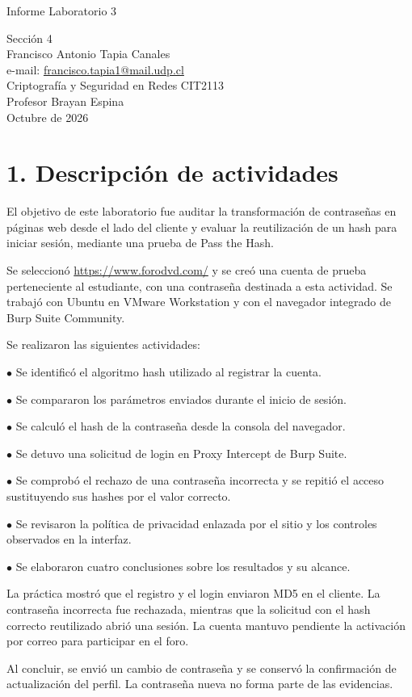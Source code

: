 \documentclass[11pt,letterpaper]{article}
\begin{document}
\raggedright
\begin{center}{\LARGE Informe Laboratorio 3}\end{center}
\begin{center}Sección 4\\[9pt]
Francisco Antonio Tapia Canales\\
e-mail: \href{mailto:francisco.tapia1@mail.udp.cl}{francisco.tapia1@mail.udp.cl}\\[9pt]
Criptografía y Seguridad en Redes CIT2113\\
Profesor Brayan Espina\\
Octubre de 2026\end{center}
\tableofcontents
\newpage
\section*{1. Descripción de actividades}
El objetivo de este laboratorio fue auditar la transformación de contraseñas en páginas web desde el lado del cliente y evaluar la reutilización de un hash para iniciar sesión, mediante una prueba de Pass the Hash.\par
Se seleccionó \url{https://www.forodvd.com/} y se creó una cuenta de prueba perteneciente al estudiante, con una contraseña destinada a esta actividad. Se trabajó con Ubuntu en VMware Workstation y con el navegador integrado de Burp Suite Community.\par
Se realizaron las siguientes actividades:\par
$\bullet$ Se identificó el algoritmo hash utilizado al registrar la cuenta.\par
$\bullet$ Se compararon los parámetros enviados durante el inicio de sesión.\par
$\bullet$ Se calculó el hash de la contraseña desde la consola del navegador.\par
$\bullet$ Se detuvo una solicitud de login en Proxy Intercept de Burp Suite.\par
$\bullet$ Se comprobó el rechazo de una contraseña incorrecta y se repitió el acceso sustituyendo sus hashes por el valor correcto.\par
$\bullet$ Se revisaron la política de privacidad enlazada por el sitio y los controles observados en la interfaz.\par
$\bullet$ Se elaboraron cuatro conclusiones sobre los resultados y su alcance.\par
La práctica mostró que el registro y el login enviaron MD5 en el cliente. La contraseña incorrecta fue rechazada, mientras que la solicitud con el hash correcto reutilizado abrió una sesión. La cuenta mantuvo pendiente la activación por correo para participar en el foro.\par
Al concluir, se envió un cambio de contraseña y se conservó la confirmación de actualización del perfil. La contraseña nueva no forma parte de las evidencias.\par
\newpage
\end{document}
